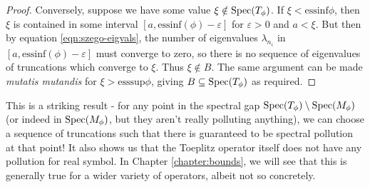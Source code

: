 \documentclass[../main.tex]{subfiles}
\begin{document}
\begin{proof}
Conversely, suppose we have some value $\xi \notin \mathrm{Spec}(T_\phi)$. If $\xi <
\mathrm{essinf}\phi$, then $\xi$ is contained in some interval $[a,
\mathrm{essinf}(\phi) - \varepsilon]$ for $\varepsilon > 0$ and $a < \xi$. But
then by equation \ref{eqn:szego-eigvals}, the number of eigenvalues
$\lambda_{n_i}$ in $[a, \mathrm{essinf}(\phi) - \varepsilon]$ must converge to
zero, so there is no sequence of eigenvalues of truncations which converge to
$\xi$. Thus $\xi \notin B$. The same argument can be made \emph{mutatis
mutandis} for $\xi > \mathrm{esssup}\phi$, giving $B \subseteq \mathrm{Spec}(T_\phi)$ as
required.
\end{proof}

This is a striking result - for any point in the spectral gap $\mathrm{Spec}(T_\phi)
\setminus \mathrm{Spec}(M_\phi)$ (or indeed in $\mathrm{Spec}(M_\phi)$, but they aren't really
polluting anything), we can choose a sequence of truncations such that there is
guaranteed to be spectral pollution at that point! It also shows us that the
Toeplitz operator itself does not have any pollution for real symbol.
In Chapter \ref{chapter:bounds}, we will see that this is generally true for
a wider variety of operators, albeit not so concretely.
\end{document}
